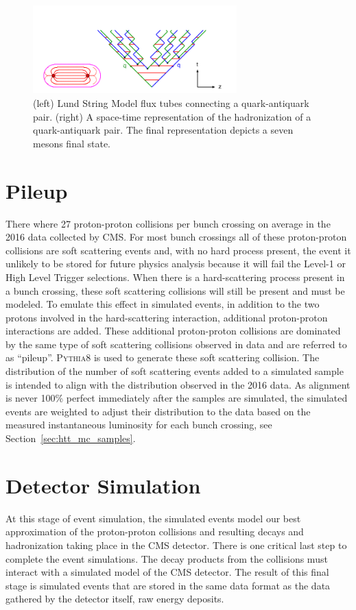 \begin{figure}[htbp]
\centering
     \includegraphics[width=0.7\textwidth]{simulation/plots/lund_time-space.png}
     \caption{
(left) Lund String Model flux tubes connecting a quark-antiquark pair. (right) A
space-time representation of the hadronization of a quark-antiquark pair. 
The final representation depicts a seven mesons final state.
     }
     \label{fig:sim_lund_string}
\end{figure}



\section{Pileup}
There where 27 proton-proton collisions per bunch crossing on average
in the 2016 data collected by CMS.
For most bunch crossings all of these proton-proton collisions are soft
scattering events and, with no hard process present, the event it unlikely to be stored for
future physics analysis because it will fail the Level-1 or High Level Trigger selections. 
When there is a hard-scattering process present in a bunch crossing,
these soft scattering collisions will still be present and must be modeled. 
To emulate this effect in simulated events, in addition to the two protons involved in the 
hard-scattering interaction, additional proton-proton interactions are added. 
These additional proton-proton collisions are
dominated by the same type of soft scattering collisions observed in data and are referred to as ``pileup''.
\textsc{Pythia8} is used to generate these soft scattering collision. 
The distribution of the number of soft scattering events added to a simulated 
sample is intended to align with the distribution observed in the 2016 data.
As alignment is never 100\% perfect immediately after the samples are simulated, the simulated events
are weighted to adjust their distribution to the data based on the measured instantaneous
luminosity for each bunch crossing, see Section~\ref{sec:htt_mc_samples}.



\section{Detector Simulation}
At this stage of event simulation, the simulated events model our best approximation
of the proton-proton collisions and resulting decays and hadronization taking place
in the CMS detector. There is one critical last step to complete the event
simulations. The decay products from the collisions must interact with a simulated
model of the CMS detector. The result of this final stage is simulated events that
are stored in the same data format as the data gathered by the detector itself,
raw energy deposits.

